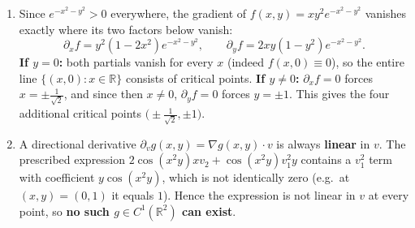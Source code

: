 \begin{exercisesolution}
\begin{enumerate}[label=\textbf{(\alph*)}]
  \item Since $e^{-x^2-y^2} > 0$ everywhere, the gradient of $f(x,y) = xy^2e^{-x^2-y^2}$ vanishes
    exactly where its two factors below vanish:
    \[
    \partial_x f = y^2(1-2x^2)e^{-x^2-y^2}, \qquad \partial_y f = 2xy(1-y^2)e^{-x^2-y^2}.
    \]
    \textbf{If $y=0$:} both partials vanish for every $x$ (indeed $f(x,0) \equiv 0$), so the
    entire line $\{(x,0) : x \in \mathbb{R}\}$ consists of critical points.
    \textbf{If $y \neq 0$:} $\partial_x f = 0$ forces $x = \pm\tfrac{1}{\sqrt2}$, and since then
    $x \neq 0$, $\partial_y f = 0$ forces $y = \pm 1$. This gives the four additional critical
    points $\big(\pm\tfrac{1}{\sqrt2}, \pm 1\big)$.
  \item A directional derivative $\partial_v g(x,y) = \nabla g(x,y)\cdot v$ is always
    \textbf{linear} in $v$. The prescribed expression
    $2\cos(x^2y)xv_2 + \cos(x^2y)v_1^2 y$ contains a $v_1^2$ term with coefficient
    $y\cos(x^2y)$, which is not identically zero (e.g.\ at $(x,y)=(0,1)$ it equals $1$). Hence
    the expression is not linear in $v$ at every point, so \textbf{no such $g \in C^1(\mathbb{R}^2)$
    can exist}.
\end{enumerate}
\end{exercisesolution}


